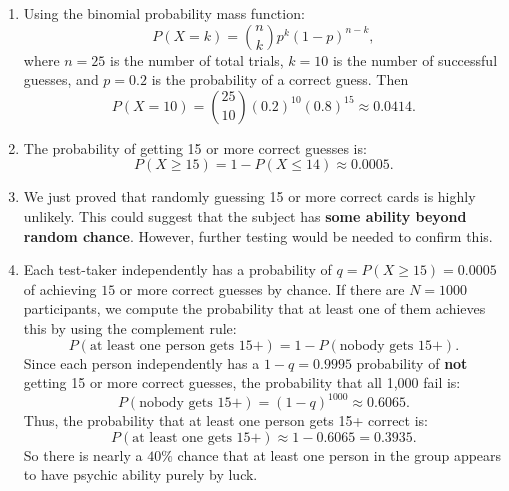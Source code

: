 \documentclass[12pt]{article}
\begin{document}
\begin{enumerate}
\begin{enumerate}
        \item Using the binomial probability mass function:
         $$   
        P(X = k) = \binom{n}{k} p^k (1 - p)^{n-k},
        $$
        where $n = 25$ is the number of total trials, $k = 10$ is the number of successful guesses, and $p = 0.2$ is the probability of a correct guess. Then
        $$
        P(X = 10) = \binom{25}{10} (0.2)^{10} (0.8)^{15} \approx 0.0414.
        $$
        
        \item The probability of getting 15 or more correct guesses is:
        $$
        P(X \geq 15) = 1 - P(X \leq 14) \approx 0.0005.
        $$

        \item We just proved that randomly guessing 15 or more correct cards is highly unlikely. This could suggest that the subject has \textbf{some ability beyond random chance}. However, further testing would be needed to confirm this.

        \item Each test-taker independently has a probability of
        $
        q = P(X \geq 15) = 0.0005
        $
        of achieving $15$ or more correct guesses by chance. 
        If there are \( N = 1000 \) participants, we compute the probability that at least one of them achieves this by using the complement rule:
        \[
        P(\text{at least one person gets 15+}) = 1 - P(\text{nobody gets 15+}).
        \]
        Since each person independently has a \( 1 - q = 0.9995 \) probability of \textbf{not} getting 15 or more correct guesses, the probability that all 1,000 fail is:
        \[ 
        P(\text{nobody gets 15+}) = (1-q)^{1000} \approx 0.6065.
        \]
        Thus, the probability that at least one person gets 15+ correct is:
        $$
        P(\text{at least one gets 15+}) \approx 1 - 0.6065 = 0.3935.
        $$
        So there is nearly a $40\%$ chance that at least one person in the group appears to have psychic ability purely by luck.


\end{enumerate}
\end{enumerate}
\end{document}
